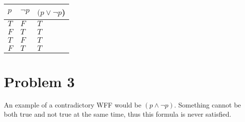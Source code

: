 \documentclass{article}%
\begin{document}
\\
\vspace{4mm}
\begin{tabular}{l | l | l |}
    $p$ & $\neg p$  & $(p \vee \neg p$) \\ \hline
    $T$ & $F$       & $T$ \\ \hline
    $F$ & $T$       & $T$ \\ \hline
    $T$ & $F$       & $T$ \\ \hline
    $F$ & $T$       & $T$ \\
    \hline
\end{tabular}

\section*{Problem 3}

An example of a contradictory WFF would be $(p \wedge \neg p)$. Something cannot be both true and not true at the same
time, thus this formula is never satisfied.
\end{document}
